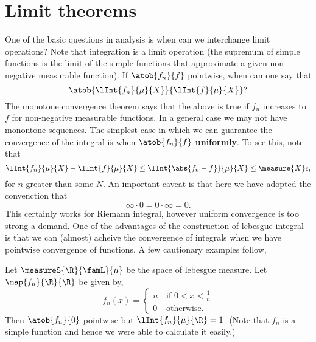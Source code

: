 \section{Limit theorems}
One of the basic questions in analysis is when can we interchange limit operations? Note that integration is a
limit operation (the supremum of simple functions is the limit of the simple functions that approximate a
given non-negative measurable function). If $\atob{f_n}{f}$ pointwise, when can one say that
\[\atob{\lInt{f_n}{\mu}{X}}{\lInt{f}{\mu}{X}}?\]
The monotone convergence theorem says that the above is true if $f_n$ increases to $f$ for non-negative
measurable functions. In a general case we may not have monontone sequences. The simplest case in which we can
guarantee the convergence of the integral is when $\atob{f_n}{f}$ \textbf{uniformly}. To see this, note that
\[\lInt{f_n}{\mu}{X} - \lInt{f}{\mu}{X} \leq \lInt{\abs{f_n-f}}{\mu}{X}\leq \measure{X}\epsilon,\]
for $n$ greater than some $N$. An important caveat is that here we have adopted the convenction that
\[\infty\cdot 0 = 0\cdot\infty = 0.\]
This certainly works for Riemann integral, however uniform convergence is too strong a demand. One of the
advantages of the construction of lebesgue integral is that we can (almost) acheive the convergence of
integrals when we have pointwise convergence of functions. A few cautionary examples follow,
\begin{Example}
    Let $\measureS{\R}{\famL}{\mu}$ be the space of lebesgue measure. 
    Let \\$\map{f_n}{\R}{\R}$ be given by,
    \begin{equation*}
	f_n(x) = 
	\begin{cases}
	    n &\,\text{if $0 < x < \frac{1}{n}$} \\
	    0 &\, \text{otherwise.}
	\end{cases}
    \end{equation*}
    Then $\atob{f_n}{0}$ pointwise but $\lInt{f_n}{\mu}{\R} = 1$. (Note that $f_n$ is a simple function and
    hence we were able to calculate it easily.)
\end{Example}

